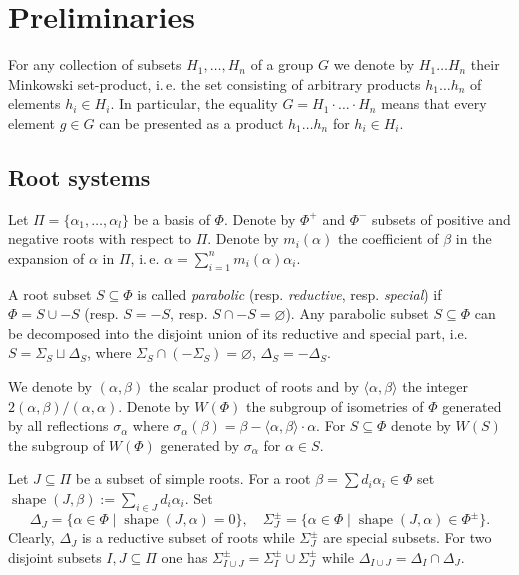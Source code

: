 \documentclass[12pt]{amsart}
\numberwithin{equation}{section}
\theoremstyle{definition}
\DeclareMathOperator{\shape}{shape}
\begin{document}
\section{Preliminaries}\label{sec:prelim}
For any collection of subsets $H_1,\ldots, H_n$ of a group $G$ we denote by $H_1\ldots H_n$ their Minkowski set-product,
i.\,e. the set consisting of arbitrary products $h_1\ldots h_n$ of elements $h_i\in H_i$. In particular, the equality
$G = H_1\cdot\ldots\cdot H_n$ means that every element $g\in G$ can be presented as a product $h_1\ldots h_n$ for $h_i\in H_i$.

\subsection{Root systems}
Let $\Pi=\{\alpha_1, \ldots, \alpha_l\}$ be a basis of $\Phi$. Denote by $\Phi^+$ and $\Phi^-$ subsets of positive and negative roots with respect to $\Pi$.
Denote by $m_i(\alpha)$ the coefficient of $\beta$ in the expansion of $\alpha$ in $\Pi$, i.\,e. $\alpha = \sum_{i=1}^n m_i(\alpha) \alpha_i$.

A root subset $S\subseteq \Phi$ is called {\it parabolic} (resp. {\it reductive}, resp. {\it special}) if $\Phi=S \cup -S$ (resp. $S = -S$, resp. $S \cap -S=\varnothing$).
Any parabolic subset $S \subseteq \Phi$ can be decomposed into the disjoint union of its reductive and special part, i.e. 
$S = \Sigma_S \sqcup \Delta_S$, where $\Sigma_S \cap (-\Sigma_S) = \varnothing$, $\Delta_S = -\Delta_S$.

We denote by $(\alpha, \beta)$ the scalar product of roots and by $\langle \alpha, \beta\rangle$ the integer $2(\alpha, \beta)/(\alpha, \alpha)$.
Denote by $W(\Phi)$ the subgroup of isometries of $\Phi$ generated by all reflections $\sigma_\alpha$ where $\sigma_\alpha(\beta)=\beta-\langle\alpha,\beta \rangle\cdot \alpha$.
For $S\subseteq \Phi$ denote by $W(S)$ the subgroup of $W(\Phi)$ generated by $\sigma_\alpha$ for $\alpha\in S$.

Let $J\subseteq \Pi$ be a subset of simple roots. 
For a root $\beta = \sum d_i\alpha_i \in \Phi$ set $\shape(J, \beta):=\sum\limits_{i\in J}d_i \alpha_i$.
Set $$\Delta_J = \{\alpha \in \Phi \mid \shape(J, \alpha)=0\},\quad \Sigma^\pm_J = \{\alpha \in \Phi \mid \shape(J, \alpha)\in\Phi^\pm \}.$$
Clearly, $\Delta_J$ is a reductive subset of roots while $\Sigma^\pm_J$ are special subsets.
For two disjoint subsets $I, J\subseteq \Pi$ one has $\Sigma^\pm_{I \cup J} = \Sigma^\pm_I\cup\Sigma^\pm_J$ while $\Delta_{I\cup J} = \Delta_I \cap \Delta_J$.
\end{document}

